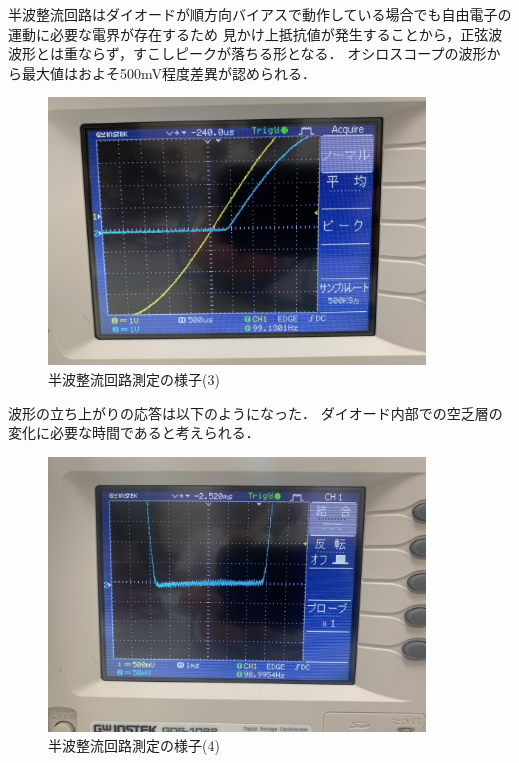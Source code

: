 \documentclass[titlepage]{jarticle}
\begin{document}
半波整流回路はダイオードが順方向バイアスで動作している場合でも自由電子の運動に必要な電界が存在するため
見かけ上抵抗値が発生することから，正弦波波形とは重ならず，すこしピークが落ちる形となる．
オシロスコープの波形から最大値はおよそ500mV程度差異が認められる．

\begin{figure}[H]
    \begin{center}
        \includegraphics[width=10cm]{image/diode/S__19873811.jpg}
        \caption{半波整流回路測定の様子(3)}
        \label{fig:半波整流回路測定の様子(3)}
    \end{center}
\end{figure}

波形の立ち上がりの応答は以下のようになった．
ダイオード内部での空乏層の変化に必要な時間であると考えられる．

\begin{figure}[H]
    \begin{center}
        \includegraphics[width=10cm]{image/diode/S__19873802.jpg}
        \caption{半波整流回路測定の様子(4)}
        \label{fig:半波整流回路測定の様子(4)}
    \end{center}
\end{figure}
\end{document}
